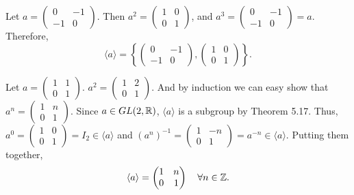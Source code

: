 \documentclass[12pt]{article}
\begin{document}
\begin{problem}[5.22]
	Let $a= \begin{pmatrix} 0&-1\\-1&0 \end{pmatrix} $. Then $a^2 = \begin{pmatrix} 1&0\\0&1 \end{pmatrix} $, and $a^3 = \begin{pmatrix} 0&-1\\-1&0 \end{pmatrix} = a$. Therefore, 
	\[
		\langle a \rangle = \left\{ \begin{pmatrix} 0&-1\\-1&0 \end{pmatrix} , \begin{pmatrix} 1&0\\0&1 \end{pmatrix}  \right\} 
	.\] 
\end{problem}

\begin{problem}[5.23]
	Let $a= \begin{pmatrix} 1&1\\0&1 \end{pmatrix} $. $a^2 = \begin{pmatrix} 1&2\\0&1 \end{pmatrix} $. And by induction we can easy show that $a^{n} = \begin{pmatrix} 1&n\\0&1 \end{pmatrix} $. Since $a \in GL(2, \mathbb{R})$, $\langle a \rangle$ is a subgroup by Theorem 5.17. Thus, $a^{0} = \begin{pmatrix} 1&0\\0&1 \end{pmatrix} = I_2 \in \langle a \rangle$ and $(a^{n})^{-1} = \begin{pmatrix} 1&-n\\0&1 \end{pmatrix} = a^{-n} \in \langle a \rangle$. Putting them together,
\[
	\langle a \rangle = \begin{pmatrix} 1&n\\0&1 \end{pmatrix} \quad \forall n \in \mathbb{Z}
.\] 
\end{problem}
\end{document}
